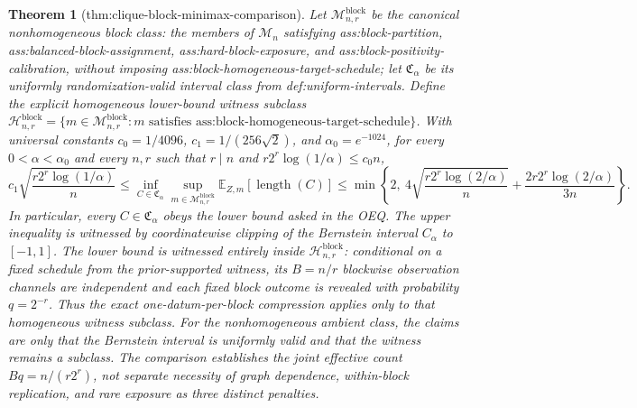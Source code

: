\documentclass{article}
\newtheorem{theorem}{Theorem}
\begin{document}
\begin{theorem}[thm:clique-block-minimax-comparison]\label{thm:clique-block-minimax-comparison}
Let \(\mathcal M_{n,r}^{\mathrm{block}}\) be the canonical nonhomogeneous block class: the members of \(\mathcal M_n\) satisfying ass:block-partition, ass:balanced-block-assignment, ass:hard-block-exposure, and ass:block-positivity-calibration, without imposing ass:block-homogeneous-target-schedule; let \(\mathfrak C_\alpha\) be its uniformly randomization-valid interval class from def:uniform-intervals. Define the explicit homogeneous lower-bound witness subclass \(\mathcal H_{n,r}^{\mathrm{block}}=\{m\in\mathcal M_{n,r}^{\mathrm{block}}:m\text{ satisfies ass:block-homogeneous-target-schedule}\}\). With universal constants \(c_0=1/4096\), \(c_1=1/(256\sqrt2)\), and \(\alpha_0=e^{-1024}\), for every \(0<\alpha<\alpha_0\) and every \(n,r\) such that \(r\mid n\) and \(r2^r\log(1/\alpha)\le c_0n\),
\[
c_1\sqrt{\frac{r2^r\log(1/\alpha)}n}
\le \inf_{C\in\mathfrak C_\alpha}\sup_{m\in\mathcal M_{n,r}^{\mathrm{block}}}\mathbb E_{Z,m}[\operatorname{length}(C)]
\le \min\left\{2,\ 4\sqrt{\frac{r2^r\log(2/\alpha)}n}+\frac{2r2^r\log(2/\alpha)}{3n}\right\}.
\]
In particular, every \(C\in\mathfrak C_\alpha\) obeys the lower bound asked in the OEQ. The upper inequality is witnessed by coordinatewise clipping of the Bernstein interval \(C_\alpha\) to \([-1,1]\). The lower bound is witnessed entirely inside \(\mathcal H_{n,r}^{\mathrm{block}}\): conditional on a fixed schedule from the prior-supported witness, its \(B=n/r\) blockwise observation channels are independent and each fixed block outcome is revealed with probability \(q=2^{-r}\). Thus the exact one-datum-per-block compression applies only to that homogeneous witness subclass. For the nonhomogeneous ambient class, the claims are only that the Bernstein interval is uniformly valid and that the witness remains a subclass. The comparison establishes the joint effective count \(Bq=n/(r2^r)\), not separate necessity of graph dependence, within-block replication, and rare exposure as three distinct penalties.
\end{theorem}
\end{document}
